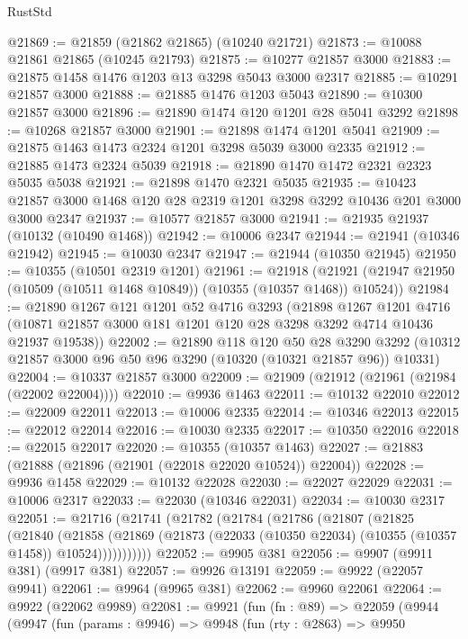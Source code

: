 \begin{lexlean}{RustStd}
\begin{coremodule}
@21869 := @21859 (@21862 @21865) (@10240 @21721)
@21873 := @10088 @21861 @21865 (@10245 @21793)
@21875 := @10277 @21857 @3000
@21883 := @21875 @1458 @1476 @1203 @13 @3298 @5043 @3000 @2317
@21885 := @10291 @21857 @3000
@21888 := @21885 @1476 @1203 @5043
@21890 := @10300 @21857 @3000
@21896 := @21890 @1474 @120 @1201 @28 @5041 @3292
@21898 := @10268 @21857 @3000
@21901 := @21898 @1474 @1201 @5041
@21909 := @21875 @1463 @1473 @2324 @1201 @3298 @5039 @3000 @2335
@21912 := @21885 @1473 @2324 @5039
@21918 := @21890 @1470 @1472 @2321 @2323 @5035 @5038
@21921 := @21898 @1470 @2321 @5035
@21935 := @10423 @21857 @3000 @1468 @120 @28 @2319 @1201 @3298 @3292 @10436 @201 @3000 @3000 @2347
@21937 := @10577 @21857 @3000
@21941 := @21935 @21937 (@10132 (@10490 @1468))
@21942 := @10006 @2347
@21944 := @21941 (@10346 @21942)
@21945 := @10030 @2347
@21947 := @21944 (@10350 @21945)
@21950 := @10355 (@10501 @2319 @1201)
@21961 := @21918
    (@21921 (@21947 @21950 (@10509 (@10511 @1468 @10849)) (@10355 (@10357 @1468)) @10524))
@21984 := @21890
    @1267
    @121
    @1201
    @52
    @4716
    @3293
    (@21898
      @1267
      @1201
      @4716
      (@10871 @21857 @3000 @181 @1201 @120 @28 @3298 @3292 @4714 @10436 @21937 @19538))
@22002 := @21890
    @118
    @120
    @50
    @28
    @3290
    @3292
    (@10312 @21857 @3000 @96 @50 @96 @3290 (@10320 (@10321 @21857 @96)) @10331)
@22004 := @10337 @21857 @3000
@22009 := @21909 (@21912 (@21961 (@21984 (@22002 @22004))))
@22010 := @9936 @1463
@22011 := @10132 @22010
@22012 := @22009 @22011
@22013 := @10006 @2335
@22014 := @10346 @22013
@22015 := @22012 @22014
@22016 := @10030 @2335
@22017 := @10350 @22016
@22018 := @22015 @22017
@22020 := @10355 (@10357 @1463)
@22027 := @21883 (@21888 (@21896 (@21901 (@22018 @22020 @10524)) @22004))
@22028 := @9936 @1458
@22029 := @10132 @22028
@22030 := @22027 @22029
@22031 := @10006 @2317
@22033 := @22030 (@10346 @22031)
@22034 := @10030 @2317
@22051 := @21716
    (@21741
      (@21782
        (@21784
          (@21786
            (@21807
              (@21825
                (@21840
                  (@21858
                    (@21869
                      (@21873 (@22033 (@10350 @22034) (@10355 (@10357 @1458)) @10524)))))))))))
@22052 := @9905 @381
@22056 := @9907 (@9911 @381) (@9917 @381)
@22057 := @9926 @13191
@22059 := @9922 (@22057 @9941)
@22061 := @9964 (@9965 @381)
@22062 := @9960 @22061
@22064 := @9922 (@22062 @9989)
@22081 := @9921
    (fun (fn : @89) =>
    @22059
      (@9944
        (@9947
          (fun (params : @9946) =>
          @9948
            (fun (rty : @2863) =>
            @9950

\end{coremodule}
\end{lexlean}
